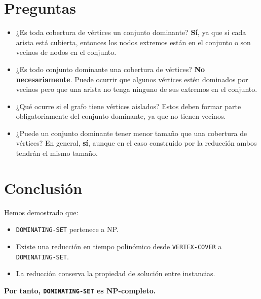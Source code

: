 \documentclass[a4paper,12pt]{article}
\begin{document}
\section{Preguntas}

\begin{itemize}
    \item ¿Es toda cobertura de vértices un conjunto dominante? \textbf{Sí}, ya que si cada arista está cubierta, entonces los nodos extremos están en el conjunto o son vecinos de nodos en el conjunto.
    \item ¿Es todo conjunto dominante una cobertura de vértices? \textbf{No necesariamente}. Puede ocurrir que algunos vértices estén dominados por vecinos pero que una arista no tenga ninguno de sus extremos en el conjunto.
    \item ¿Qué ocurre si el grafo tiene vértices aislados? Estos deben formar parte obligatoriamente del conjunto dominante, ya que no tienen vecinos.
    \item ¿Puede un conjunto dominante tener menor tamaño que una cobertura de vértices? En general, \textbf{sí}, aunque en el caso construido por la reducción ambos tendrán el mismo tamaño.
\end{itemize}

\section{Conclusión}
Hemos demostrado que:
\begin{itemize}
    \item \texttt{DOMINATING-SET} pertenece a NP.
    \item Existe una reducción en tiempo polinómico desde \texttt{VERTEX-COVER} a \texttt{DOMINATING-SET}.
    \item La reducción conserva la propiedad de solución entre instancias.
\end{itemize}

\textbf{Por tanto, \texttt{DOMINATING-SET} es NP-completo.}
\end{document}
